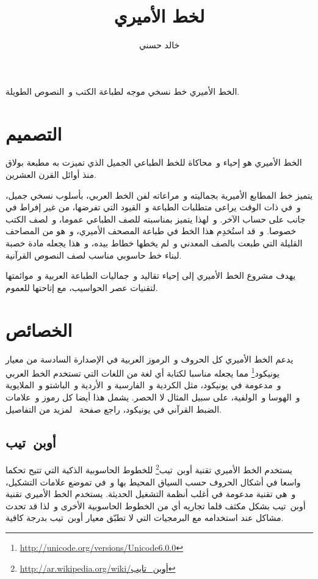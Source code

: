 \documentclass[a4paper]{article}
\title{\titlefont {\addfontfeatures{CharacterVariant=1}ا}لخط الأمير{\addfontfeatures{CharacterVariant=1}ي}}
\author{خالد حسني}
\begin{document}
\maketitle
\tableofcontents
\newpage


الخط الأميري خط نسخي موجه لطباعة الكتب و النصوص الطويلة.

\section{التصميم}
الخط الأميري هو إحياء و محاكاة للخط الطباعي الجميل الذي تميزت به مطبعة
بولاق منذ أوائل القرن العشرين.

يتميز خط المطابع الأميرية بجماليته و مراعاته لفن الخط العربي، بأسلوب
نسخي جميل، و في ذات الوقت يراعى متطلبات الطباعة و القيود التي تفرضها، من
غير إفراط في جانب على حساب الآخر. و لهذا يتميز بمناسبته للصف الطباعي
عموما، و لصف الكتب خصوصا. و قد استُخدِم هذا الخط في طباعة المصحف
الأميري، و هو من المصاحف القليلة التي طبعت بالصف المعدني و لم يخطها خطاط
بيده، و هذا يجعله مادة خصبة لبناء خط حاسوبي مناسب لصف النصوص القرآنية.

يهدف مشروع الخط الأميري إلى إحياء تقاليد و جماليات الطباعة العربية
و موائمتها لتقنيات عصر الحواسيب، مع إتاحتها للعموم.

\section{الخصائص}
يدعم الخط الأميري كل الحروف و الرموز العربية في الإصدارة السادسة من
معيار يونيكود\footnote{\url{http://unicode.org/versions/Unicode6.0.0}}
مما يجعله مناسبا لكتابة أي لغة من اللغات التي تستخدم الخط العربي
و مدعومة في يونيكود، مثل الكردية و الفارسية و الأردية و الباشتو
و الملايوية و الهوسا و الولفية، على سبيل المثال لا الحصر. يشمل هذا أيضا
كل رموز و علامات الضبط القرآني في يونيكود، راجع
صفحة \pageref{ref:quranic-text} لمزيد من التفاصيل.

\subsection{أوبن تيب}
يستخدم الخط الأميري تقنية
أوبن تيب\footnote{\url{http://ar.wikipedia.org/wiki/أوبن_تايب}} للخطوط
الحاسوبية الذكية التي تتيح تحكما واسعا في أشكال الحروف حسب السياق المحيط
بها و في تموضع علامات التشكيل، و هي تقنية مدعومة في أغلب أنظمة التشغيل
الحديثة. يستخدم الخط الأميري تقنية أوبن تيب بشكل مكثف قلما تجاريه أي من
الخطوط الحاسوبية الأخرى و لذا قد تحدث مشاكل عند استخدامه مع البرمجيات
التي لا تطبّق معيار أوبن تيب بدرجة كافية.
\end{document}
